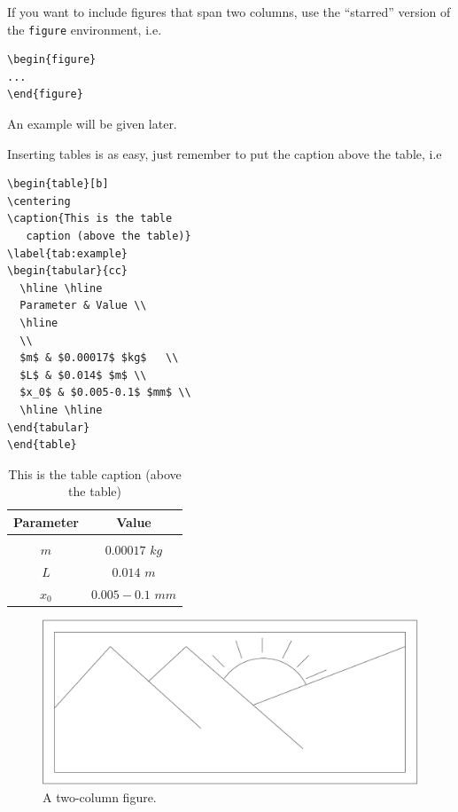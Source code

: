 \documentclass{fonetik}
\begin{document}
If you want to include figures that span two columns, use the
``starred'' version of the {\tt figure} environment, i.e.
\begin{verbatim}
\begin{figure}
...
\end{figure}
\end{verbatim}
An example will be given later.

Inserting tables is as easy, just remember to put the caption above the
table, i.e
\begin{verbatim}
\begin{table}[b]
\centering
\caption{This is the table
   caption (above the table)}
\label{tab:example}
\begin{tabular}{cc}
  \hline \hline
  Parameter & Value \\
  \hline
  \\
  $m$ & $0.00017$ $kg$   \\
  $L$ & $0.014$ $m$ \\
  $x_0$ & $0.005-0.1$ $mm$ \\
  \hline \hline
\end{tabular}
\end{table}
\end{verbatim}

\begin{table}[b]
\centering
\caption{This is the table caption
  (above the table)}
\label{tab:example}
\begin{tabular}{cc}
  \hline \hline
     Parameter & Value \\
     \hline
     \\
      $m$ & $0.00017$ $kg$   \\
      $L$ & $0.014$ $m$ \\
      $x_0$ & $0.005-0.1$ $mm$ \\
      \hline \hline
\end{tabular}
\end{table}

\begin{figure}[!t]
\centering
\includegraphics[width=\textwidth]{figa}
\caption{A two-column figure.} \label{fig:twocol}
\end{figure}
\end{document}
